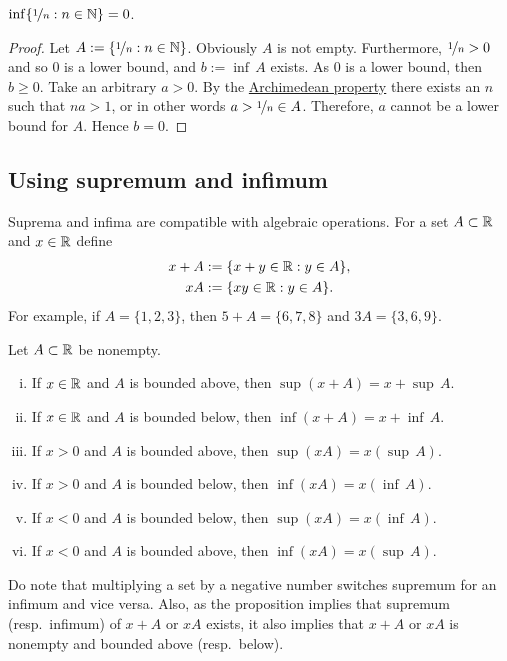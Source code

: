 \begin{cor}
$\inf \{ \nicefrac{1}{n} : n \in {\mathbb{N}} \} = 0$.
\end{cor}

\begin{proof}
Let $A := \{ \nicefrac{1}{n} : n \in {\mathbb{N}} \}$.  Obviously $A$ is not empty.
Furthermore,
$\nicefrac{1}{n} > 0$ and so 0 is a lower bound, and $b := \inf\, A$ exists.
As 0 is a lower bound, then $b \geq 0$.
Take an arbitrary $a > 0$.  By the
\hyperref[thm:arch:i]{Archimedean property} there exists an $n$ such that
$na > 1$, or in other words $a > \nicefrac{1}{n} \in A$.  Therefore,
$a$ cannot be a lower bound for $A$.  Hence $b=0$.
\end{proof}

\subsection{Using supremum and infimum}

Suprema and infima are
compatible with algebraic operations.  For a set $A \subset {\mathbb{R}}$ and 
$x \in {\mathbb{R}}$ define
\begin{align*}
x + A & := \{ x+y \in {\mathbb{R}} : y \in A \} , \\
xA & := \{ xy \in {\mathbb{R}} : y \in A \} .
\end{align*}
For example, if $A = \{ 1,2,3 \}$, then $5+A = \{ 6,7,8 \}$ and $3A = \{ 3,6,9
\}$.

\begin{prop} \label{prop:supinfalg}
Let $A \subset {\mathbb{R}}$ be nonempty.
\begin{enumerate}[(i)]
\item If $x \in {\mathbb{R}}$ and $A$ is bounded above, then $\sup (x+A) = x + \sup\, A$.
\item If $x \in {\mathbb{R}}$ and $A$ is bounded below, then $\inf (x+A) = x + \inf\, A$.
\item If $x > 0$ and $A$ is bounded above, then $\sup (xA) = x ( \sup\, A )$.
\item If $x > 0$ and $A$ is bounded below, then $\inf (xA) = x ( \inf\, A )$.
\item If $x < 0$ and $A$ is bounded below, then $\sup (xA) = x ( \inf\, A )$.
\item If $x < 0$ and $A$ is bounded above, then $\inf (xA) = x ( \sup\, A )$.
\end{enumerate}
\end{prop}

Do note that multiplying a set by a negative number switches supremum for an
infimum and vice versa.  Also, as the proposition implies that
supremum (resp.\ infimum) of $x+A$ or $xA$ exists, 
it also implies that $x+A$ or $xA$
is nonempty and bounded above (resp.\ below).

